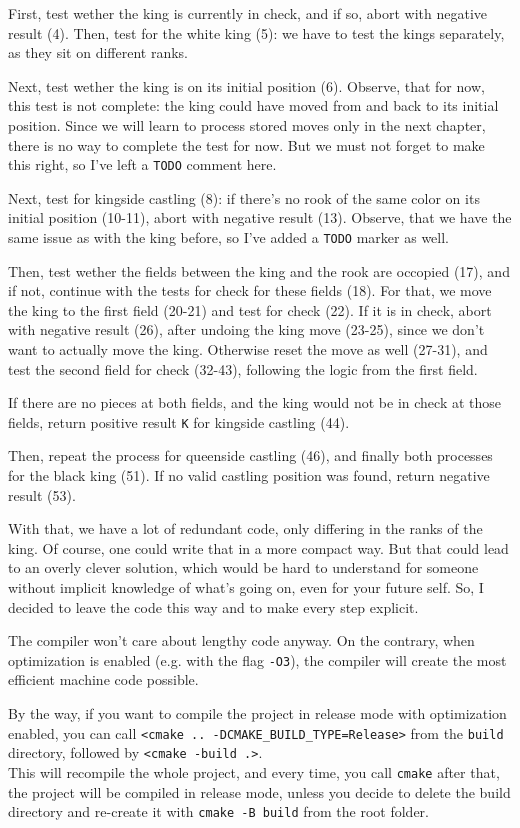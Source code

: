 First, test wether the king is currently in check, and if so, abort with negative result (4).
Then, test for the white king (5): we have to test the kings separately, as they sit on different ranks.

Next, test wether the king is on its initial position (6).
Observe, that for now, this test is not complete: the king could have moved from and back to its initial
position.
Since we will learn to process stored moves only in the next chapter, there is no way to complete the
test for now.
But we must not forget to make this right, so I've left a \texttt{TODO} comment here.

Next, test for kingside castling (8): if there's no rook of the same color on its initial position (10-11),
abort with negative result (13).
Observe, that we have the same issue as with the king before, so I've added a \texttt{TODO} marker as well.

Then, test wether the fields between the king and the rook are occopied (17), and if not, continue
with the tests for check for these fields (18).
For that, we move the king to the first field (20-21) and test for check (22).
If it is in check, abort with negative result (26), after undoing the king move (23-25), since we don't
want to actually move the king.
Otherwise reset the move as well (27-31), and test the second field for check (32-43), following the logic
from the first field.

If there are no pieces at both fields, and the king would not be in check at those fields, return
positive result \texttt{K} for kingside castling (44).

Then, repeat the process for queenside castling (46), and finally both processes for the black king (51).
If no valid castling position was found, return negative result (53).

With that, we have a lot of redundant code, only differing in the ranks of the king.
Of course, one could write that in a more compact way.
But that could lead to an overly clever solution, which would be hard to understand for someone without
implicit knowledge of what's going on, even for your future self.
So, I decided to leave the code this way and to make every step explicit.

The compiler won't care about lengthy code anyway.
On the contrary, when optimization is enabled (e.g. with the flag \texttt{-O3}),
the compiler will create the most efficient machine code possible.

By the way, if you want to compile the project in release mode with optimization enabled,
you can call \texttt{<cmake .. -DCMAKE\_BUILD\_TYPE=Release>}
from the \texttt{build} directory, followed by \texttt{<cmake -build .>}.\\
This will recompile the whole project, and every time, you call \texttt{cmake} after that, the project will be
compiled in release mode, unless you decide to delete the build directory and re-create it with
\texttt{cmake -B build} from the root folder.

